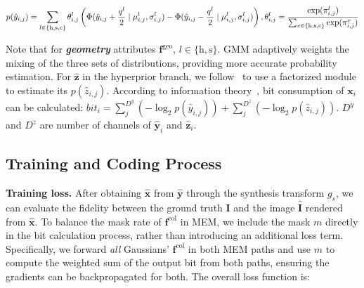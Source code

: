 \documentclass{article} %
\begin{document}
\vspace{-10pt}
\begin{small}
\begin{equation}
    p(\hat{y}_{i,j})=\sum_{l\in{\{\text{h}, \text{s}, \text{c}\}}}{\theta}_{i,j}^l\left(\Phi(\hat{{y}}_{i,j}+\frac{q^l}{2} \mid {\mu}_{i,j}^l, {\sigma}_{i,j}^l)-\Phi(\hat{{y}}_{i,j}-\frac{q^l}{2} \mid {\mu}_{i,j}^l, {\sigma}_{i,j}^l)\right), {\theta}_{i,j}^l = \frac{\exp({\pi}_{i,j}^l)}{\sum_{v\in{\{\text{h}, \text{s}, \text{c}\}}} \exp({\pi}_{i,j}^v)}
\vspace{-10pt}
\end{equation}
\end{small}

Note that for \textbf{\textit{geometry}} attributes $\bm{f}^{\text{geo}}$, $l\in{\{\text{h}, \text{s}\}}$. GMM adaptively weights the mixing of the three sets of distributions, providing more accurate probability estimation. For $\hat{\bm{z}}$ in the hyperprior branch, we follow~\citet{balle} to use a factorized module to estimate its $p(\hat{{z}}_{i,j})$. According to information theory~\citep{Elements_of_information_theory}, bit consumption of $\bm{x}_i$ can be calculated: $bit_i = \sum_j^{D^y} (-\log_2{p(\hat{y}_{i,j})}) + \sum_j^{D^z} (-\log_2{p(\hat{z}_{i,j})})$. $D^y$ and $D^z$ are number of channels of $\hat{\bm{y}}_i$ and $\hat{\bm{z}}_i$.

\subsection{Training and Coding Process}
\label{subsec:training}
\textbf{Training loss.} After obtaining $\hat{\bm{x}}$ from $\hat{\bm{y}}$ through the synthesis transform $g_s$, we can evaluate the fidelity between the ground truth $\bm{I}$ and the image $\hat{\bm{I}}$ rendered from $\hat{\bm{x}}$.
To balance the mask rate of $\bm{f}^{\text{col}}$ in MEM, we include the mask $m$ directly in the bit calculation process, rather than introducing an additional loss term. Specifically, we forward \emph{all} Gaussians' $\bm{f}^{\text{col}}$ in both MEM paths and use $m$ to compute the weighted sum of the output bit from both paths, ensuring the gradients can be backpropagated for both. The overall loss function is:
\end{document}

